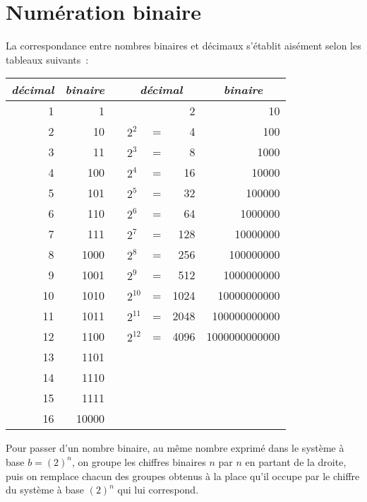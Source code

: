 \section{Numération binaire}

La correspondance entre nombres binaires et décimaux s'établit aisément
selon les tableaux suivants~:

\begin{center}
\begin{tabular}{|r|r|c|lcr|r|}
\hline 
\multicolumn{1}{|c|}{\emph{ décimal}} & \multicolumn{1}{|c||}{\emph{ binaire}} &  & \multicolumn{3}{|c|}{\emph{ décimal}} & \multicolumn{1}{|c|}{\emph{ binaire}}\tabularnewline
\hline 
1  & 1  &  &  &  & 2  & 10 \tabularnewline
2  & 10  &  & $2^{2}$  & =  & 4  & 100 \tabularnewline
3  & 11  &  & $2^{3}$  & =  & 8  & 1000 \tabularnewline
4  & 100  &  & $2^{4}$  & =  & 16  & 10000 \tabularnewline
5  & 101  &  & $2^{5}$  & =  & 32  & 100000 \tabularnewline
6  & 110  &  & $2^{6}$  & =  & 64  & 1000000 \tabularnewline
7  & 111  &  & $2^{7}$  & =  & 128  & 10000000 \tabularnewline
8  & 1000  &  & $2^{8}$  & =  & 256  & 100000000 \tabularnewline
9  & 1001  &  & $2^{9}$  & =  & 512  & 1000000000 \tabularnewline
10  & 1010  &  & $2^{10}$  & =  & 1024  & 10000000000 \tabularnewline
11  & 1011  &  & $2^{11}$  & =  & 2048  & 100000000000 \tabularnewline
12  & 1100  &  & $2^{12}$  & =  & 4096  & 1000000000000 \tabularnewline
13  & 1101  &  &  &  &  & \tabularnewline
14  & 1110  &  &  &  &  & \tabularnewline
15  & 1111  &  &  &  &  & \tabularnewline
16  & 10000  &  &  &  &  & \tabularnewline
\hline 
\end{tabular}
\end{center}

Pour passer d'un nombre binaire, au même nombre exprimé dans le système
à base $b=(2)^{n}$, on groupe les chiffres binaires $n$ par $n$
en partant de la droite, puis on remplace chacun des groupes obtenus
à la place qu'il occupe par le chiffre du système à base $(2)^{n}$
qui lui correspond.

\ifdefined\COMPLETE
\else
    
\fi
